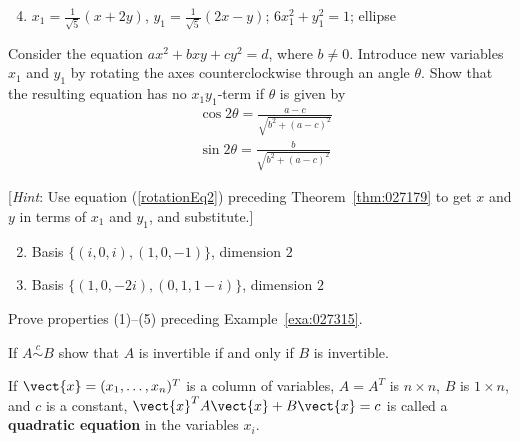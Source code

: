 \begin{multicols}{2}
\begin{ex}
\begin{sol}
\begin{enumerate}[label={\alph*.}]
\setcounter{enumi}{3}
\item $x_{1} = \frac{1}{\sqrt{5}}(x + 2y)$, $y_{1} = \frac{1}{\sqrt{5}}(2x - y)$; $6x_{1}^2 + y_{1}^2 = 1$; ellipse

\end{enumerate}
\end{sol}
\end{ex}


\begin{ex}
Consider the equation $ax^{2} + bxy + cy^{2} = d$, where $b \neq 0$. Introduce new variables $x_{1}$ and $y_{1}$ by rotating the axes counterclockwise through an angle $\theta$. Show that the resulting equation has no $x_{1}y_{1}$-term if $\theta$ is given by
\begin{align*}
& \cos2\theta = \frac{a - c}{\sqrt{b^2+(a-c)^2}}
 \\ & \sin2\theta = \frac{b}{\sqrt{b^2+(a-c)^2}}
\end{align*}

[\textit{Hint}: Use equation (\ref{rotationEq2}) preceding Theorem~\ref{thm:027179} to get $x$ and $y$ in terms of $x_{1}$ and $y_{1}$, and substitute.]

\begin{sol}
\begin{enumerate}[label={\alph*.}]
\setcounter{enumi}{1}
\item Basis $\{(i, 0, i), (1, 0, -1)\}$, dimension $2$

\setcounter{enumi}{3}
\item Basis $\{(1, 0, -2i), (0, 1, 1 - i)\}$, dimension $2$

\end{enumerate}
\end{sol}
\end{ex}

\begin{ex}
Prove properties (1)--(5) preceding Example~\ref{exa:027315}.
\end{ex}

\begin{ex}
If $A \stackrel{c}{\sim} B$ show that $A$ is invertible if and only if $B$ is invertible.
\end{ex}

\begin{ex}
If $\vect{x} = (x_{1}, \dots, x_{n})^{T}$ is a column of variables, $A = A^{T}$ is $n \times n$, $B$ is $1 \times n$, and $c$ is a constant, $\vect{x}^{T}A\vect{x} + B\vect{x} = c$ is called a \textbf{quadratic equation} in the variables $x_{i}$.



\end{ex}
\end{multicols}
